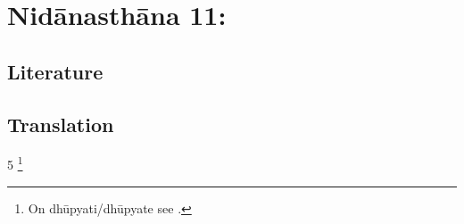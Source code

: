 
\chapter{Nidānasthāna 11: }


\section{Literature}

\section{Translation}

\begin{translation}

\item[5]  \footnote{On dhūpyati/dhūpyate see \cite[61--63]{das-1983}.}
\end{translation}
